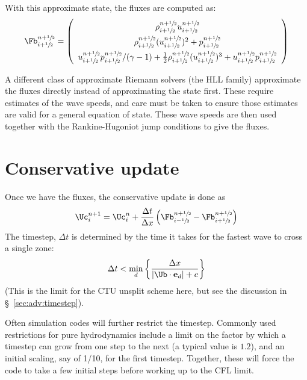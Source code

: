 With this approximate state, the fluxes are computed as:
\begin{equation}
\renewcommand{\arraystretch}{1.5}
\Fb_{i+\myhalf}^{n+\myhalf} = \left ( \begin{array}{c}
                             \rho_{i+\myhalf}^{n+\myhalf} u_{i+\myhalf}^{n+\myhalf} \\
                             \rho_{i+\myhalf}^{n+\myhalf} (u_{i+\myhalf}^{n+\myhalf})^2 + p_{i+\myhalf}^{n+\myhalf} \\
                             u_{i+\myhalf}^{n+\myhalf} p_{i+\myhalf}^{n+\myhalf} / (\gamma - 1)  +
                             \frac{1}{2} \rho_{i+\myhalf}^{n+\myhalf} (u_{i+\myhalf}^{n+\myhalf})^3 +
                             u_{i+\myhalf}^{n+\myhalf} p_{i+\myhalf}^{n+\myhalf}
                            \end{array} \right )
\renewcommand{\arraystretch}{1.0}
\end{equation}

A different class of approximate Riemann solvers (the HLL family)
approximate the fluxes directly instead of approximating the state
first.  These require estimates of the wave speeds, and care must be
taken to ensure those estimates are valid for a general equation of
state.  These wave speeds are then used together with the
Rankine-Hugoniot jump conditions to give the fluxes.


\section{Conservative update}

Once we have the fluxes, the conservative update is done as
\begin{equation}
\Uc^{n+1}_i = \Uc^n_i + \frac{\Delta t}{\Delta x}
   \left ( \Fb_{i-\myhalf}^{n+\myhalf} - \Fb_{i+\myhalf}^{n+\myhalf} \right )
\end{equation}
The timestep, $\Delta t$ is determined by the time it takes for the
fastest wave to cross a single zone:
\begin{equation}
\Delta t < \min_d \left \{ \frac{\Delta x}{|\Ub \cdot {\bf e}_d| + c}\right \}
\end{equation}
(This is the limit for the CTU unsplit scheme here, but see the discussion
in \S~\ref{sec:adv:timestep}).

Often simulation codes will further restrict the timestep.  Commonly
used restrictions for pure hydrodynamics include a limit on the factor
by which a timestep can grow from one step to the next (a typical
value is $1.2$), and an initial scaling, say of 1/10, for the first
timestep.  Together, these will force the code to take a few initial
steps before working up to the CFL limit.

